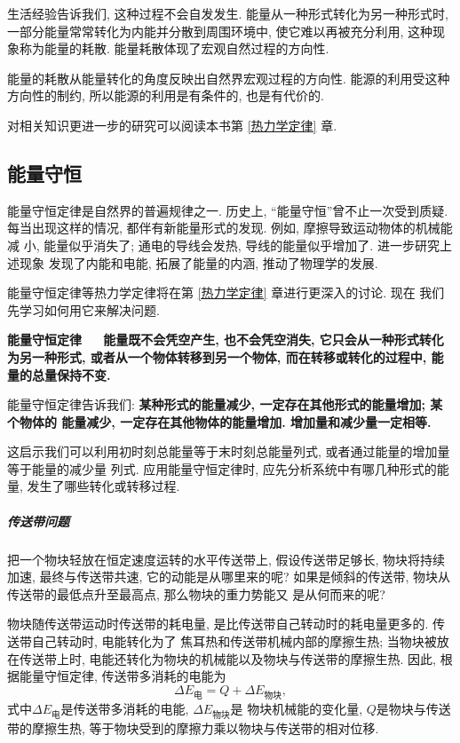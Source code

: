 \documentclass[11pt,a4paper]{ctexbook}
\newcommand{\bre}{\ \ \ }
\begin{document}
生活经验告诉我们, 这种过程不会自发发生. 能量从一种形式转化为另一种形式时,
一部分能量常常转化为内能并分散到周围环境中, 使它难以再被充分利用, 这种现象称为能量的耗散.
能量耗散体现了宏观自然过程的方向性.

能量的耗散从能量转化的角度反映出自然界宏观过程的方向性. 能源的利用受这种
方向性的制约, 所以能源的利用是有条件的, 也是有代价的.

对相关知识更进一步的研究可以阅读本书第 \ref{热力学定律} 章.

\subsection{能量守恒}

能量守恒定律是自然界的普遍规律之一. 历史上, ``能量守恒''曾不止一次受到质疑.
每当出现这样的情况, 都伴有新能量形式的发现. 例如, 摩擦导致运动物体的机械能减
小, 能量似乎消失了; 通电的导线会发热, 导线的能量似乎增加了. 进一步研究上述现象
发现了内能和电能, 拓展了能量的内涵, 推动了物理学的发展.

能量守恒定律等热力学定律将在第 \ref{热力学定律} 章进行更深入的讨论. 现在
我们先学习如何用它来解决问题.

\textbf{能量守恒定律\bre 能量既不会凭空产生, 也不会凭空消失, 它只会从一种形式转化为另一种形式,
或者从一个物体转移到另一个物体, 而在转移或转化的过程中, 能量的总量保持不变.}

能量守恒定律告诉我们: \textbf{某种形式的能量减少, 一定存在其他形式的能量增加; 某个物体的
	能量减少, 一定存在其他物体的能量增加. 增加量和减少量一定相等.}

这启示我们可以利用初时刻总能量等于末时刻总能量列式, 或者通过能量的增加量等于能量的减少量
列式. 应用能量守恒定律时, 应先分析系统中有哪几种形式的能量, 发生了哪些转化或转移过程.

\subparagraph{传送带问题} 把一个物块轻放在恒定速度运转的水平传送带上, 假设传送带足够长, 物块将持续加速, 最终与传送带共速,
它的动能是从哪里来的呢? 如果是倾斜的传送带, 物块从传送带的最低点升至最高点, 那么物块的重力势能又
是从何而来的呢?

物块随传送带运动时传送带的耗电量, 是比传送带自己转动时的耗电量更多的. 传送带自己转动时, 电能转化为了
焦耳热和传送带机械内部的摩擦生热; 当物块被放在传送带上时, 电能还转化为物块的机械能以及物块与传送带的摩擦生热.
因此, 根据能量守恒定律, 传送带多消耗的电能为
$$\Delta E_\text{电} = Q + \Delta E_\text{物块},$$
式中$\Delta E_\text{电}$是传送带多消耗的电能, $\Delta E_\text{物块}$是
物块机械能的变化量, $Q$是物块与传送带的摩擦生热, 等于物块受到的摩擦力乘以物块与传送带的相对位移.
\end{document}
